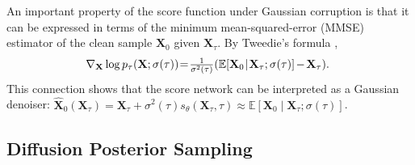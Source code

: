 \documentclass{article}
\begin{document}
An important property of the score function under Gaussian corruption is that it can be expressed in terms of the minimum mean-squared-error (MMSE) estimator of the clean sample $\mathbf{X}_0$ given $\mathbf{X}_\tau$.
By Tweedie's formula \cite{efron2011tweedie},
\begin{equation}
\hspace{-4pt}
    \nabla_{\mathbf{X}} \log p_\tau(\mathbf{X}; \sigma(\tau)) 
\hspace{-2pt}
    =
\hspace{-2pt}
    \tfrac{1}
        {\sigma^2(\tau)} 
        (\mathbb{E}[\mathbf{X}_0
\hspace{-2pt}
        \mid
\hspace{-2pt}
        \mathbf{X}_\tau; \sigma(\tau)]
\hspace{-1pt}
        -
\hspace{-1pt}
        \mathbf{X}_\tau) .
    \label{eq:tweedie}
\end{equation}
This connection shows that the score network can be interpreted as a Gaussian denoiser:
$\hat{\mathbf{X}}_0(\mathbf{X}_\tau)= \mathbf{X}_\tau+ \sigma^2(\tau) s_\theta(\mathbf{X}_\tau, \tau) \approx \mathbb{E}[\mathbf{X}_0 \mid \mathbf{X}_\tau; \sigma(\tau)]$.

\vspace{-3pt}
\subsection{Diffusion Posterior Sampling}
\vspace{-2pt}
\end{document}
